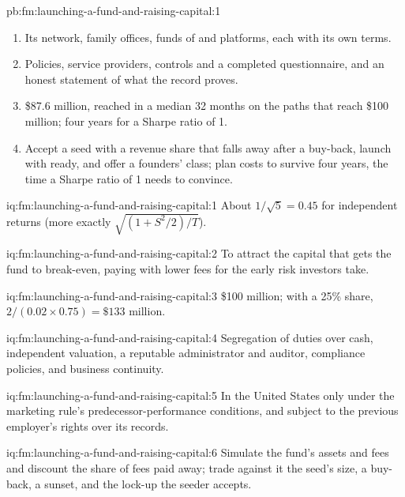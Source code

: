 \begin{solution}{pb:fm:launching-a-fund-and-raising-capital:1}
\begin{enumerate}
\item Its network, family offices, funds of  and platforms, each with its own terms.
\item Policies, service providers, controls and a completed questionnaire, and an honest statement of what the record proves.
\item \$87.6 million, reached in a median 32 months on the paths that reach \$100 million; four years for a Sharpe ratio of 1.
\item Accept a seed with a revenue share that falls away after a buy-back, launch with  ready, and offer a founders'
class; plan costs to survive four years, the time a Sharpe ratio of 1 needs to convince.
\end{enumerate}
\end{solution}

\begin{solution}{iq:fm:launching-a-fund-and-raising-capital:1}
About $1/\sqrt5=0.45$ for independent returns (more exactly $\sqrt{(1+S^2/2)/T}$).
\end{solution}

\begin{solution}{iq:fm:launching-a-fund-and-raising-capital:2}
To attract the capital that gets the fund to break-even, paying with lower fees for the early risk investors take.
\end{solution}

\begin{solution}{iq:fm:launching-a-fund-and-raising-capital:3}
\$100 million; with a 25\% share, $2/(0.02\times0.75)=\$133$ million.
\end{solution}

\begin{solution}{iq:fm:launching-a-fund-and-raising-capital:4}
Segregation of duties over cash, independent valuation, a reputable administrator and auditor, compliance policies, and business continuity.
\end{solution}

\begin{solution}{iq:fm:launching-a-fund-and-raising-capital:5}
In the United States only under the marketing rule's predecessor-performance conditions, and subject to the previous employer's rights over its
records.
\end{solution}

\begin{solution}{iq:fm:launching-a-fund-and-raising-capital:6}
Simulate the fund's assets and fees and discount the share of fees paid away; trade against it the seed's size, a buy-back, a sunset, and the lock-up
the seeder accepts.
\end{solution}
